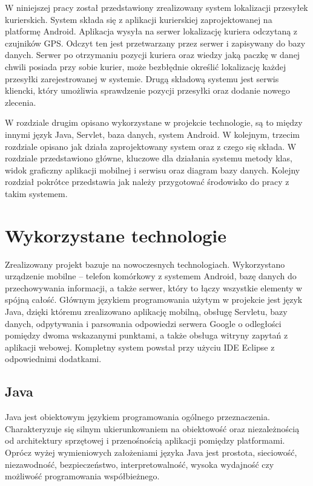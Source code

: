 \documentclass[eng,printmode,oneside]{mgr}
\begin{document}
W niniejszej pracy został przedstawiony zrealizowany system lokalizacji
przesyłek kurierskich. System składa się z aplikacji kurierskiej
zaprojektowanej na platformę Android. Aplikacja wysyła na serwer lokalizację
kuriera odczytaną z czujników GPS. Odczyt ten jest przetwarzany przez serwer i
zapisywany do bazy danych. Serwer po otrzymaniu pozycji kuriera oraz wiedzy jaką
paczkę w danej chwili posiada przy sobie kurier, może bezbłędnie określić
lokalizację każdej przesyłki zarejestrowanej w systemie.
Drugą składową systemu jest serwis kliencki, który umożliwia sprawdzenie pozycji
przesyłki oraz dodanie nowego zlecenia.

W rozdziale drugim opisano wykorzystane w projekcie technologie, są to między
innymi język Java, Servlet, baza danych, system Android. W kolejnym, trzecim
rozdziale opisano jak działa zaprojektowany system oraz z czego się składa.
W rozdziale przedstawiono główne, kluczowe dla działania systemu metody klas,
widok graficzny aplikacji mobilnej i serwisu oraz diagram bazy danych.
Kolejny rozdział pokrótce przedstawia jak należy przygotować środowisko do pracy z takim systemem.

\chapter{Wykorzystane technologie}

Zrealizowany projekt bazuje na nowoczesnych technologiach.
Wykorzystano urządzenie mobilne -- telefon komórkowy z systemem
Android, bazę danych do przechowywania informacji, a także serwer, który to
łączy wszystkie elementy w spójną całość. Głównym językiem
programowania użytym w projekcie jest język Java, dzięki któremu
zrealizowano aplikację mobilną, obsługę Servletu, bazy danych, odpytywania i
parsowania odpowiedzi serwera Google o odległości pomiędzy dwoma wskazanymi
punktami, a także obsługa witryny zapytań z aplikacji webowej. Kompletny system
powstał przy użyciu IDE Eclipse z odpowiednimi dodatkami.

\section{Java}

Java jest obiektowym językiem programowania ogólnego przeznaczenia.
Charakteryzuje się silnym ukierunkowaniem na obiektowość oraz niezależnością od
architektury sprzętowej i przenośnością aplikacji pomiędzy platformami.
Oprócz wyżej wymieniowych założeniami języka Java jest prostota, sieciowość,
niezawodność, bezpieczeństwo, interpretowalność, wysoka wydajność czy możliwość
programowania współbieżnego.
\end{document}
